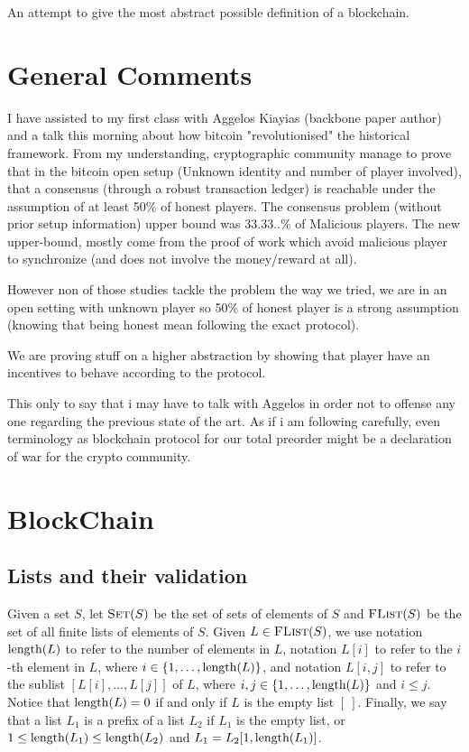 
An attempt to give the most abstract possible definition of a blockchain.

\section{General Comments}
I have assisted to my first class with Aggelos Kiayias (backbone paper author) and a talk this morning about how bitcoin "revolutionised" the historical framework. From my understanding, cryptographic community manage to prove that in the bitcoin open setup (Unknown identity and number of player involved), that a consensus (through a robust transaction ledger) is reachable under the assumption of at least 50\% of honest players. The consensus problem (without prior setup information) upper bound was 33.33..\% of Malicious players.
The new upper-bound, mostly come from the proof of work which avoid malicious player to synchronize (and does not involve the money/reward at all). 

However non of those studies tackle the problem the way we tried, we are in an open setting with unknown player so 50\% of honest player is a strong assumption (knowing that being honest mean following the exact protocol). 

We are proving stuff on a higher abstraction by showing that player have an incentives to behave according to the protocol. 

This only to say that i may have to talk with Aggelos in order not to offense any one regarding the previous state of the art. As if i am following carefully, even terminology as blockchain protocol for our total preorder might be a declaration of war for the crypto community.



\section{BlockChain}

\subsection{Lists and their validation}

Given a set $S$, let $\text{\sc Set}(S)$ be the set of sets of elements of $S$ and $\text{\sc FList}(S)$ be the set of all finite lists of elements of $S$. Given $L \in \text{\sc FList}(S)$, we use notation $\text{\rm length}(L)$ to refer to the number of elements in $L$, notation $L[i]$ to refer to the $i$-th element in $L$, where $i \in \{1, \ldots, \text{\rm length}(L)\}$, and notation $L[i,j]$ to refer to the sublist $[L[i], \ldots, L[j]]$ of $L$, where $i,j \in \{1, \ldots, \text{\rm length}(L)\}$ and $i \leq j$. Notice that $\text{\rm length}(L) = 0$ if and only if $L$ is the empty list $[\ ]$. Finally, we say that a list $L_1$ is a prefix of a list $L_2$ if $L_1$ is the empty list, or $1 \leq \text{\rm length}(L_1) \leq \text{\rm length}(L_2)$ and $L_1 = L_2[1, \text{\rm length}(L_1)]$. 

